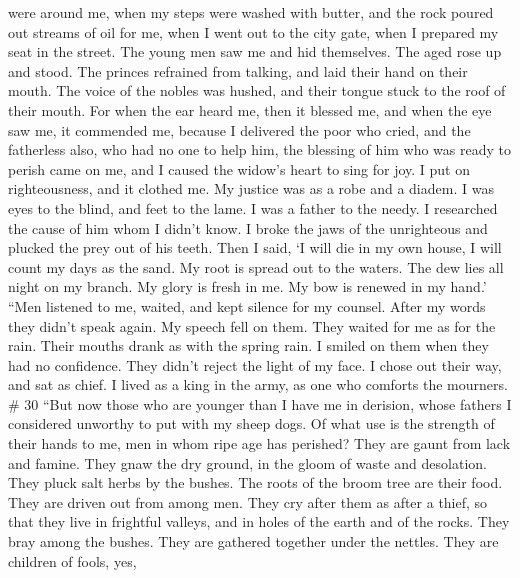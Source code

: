 were around me,  when my steps were washed with butter, and
the rock poured out streams of oil for me,  when I went out
to the city gate, when I prepared my seat in the street. 
The young men saw me and hid themselves. The aged rose up and stood.
 The princes refrained from talking, and laid their hand on
their mouth.  The voice of the nobles was hushed, and their
tongue stuck to the roof of their mouth.  For when the ear
heard me, then it blessed me, and when the eye saw me, it commended me,
 because I delivered the poor who cried, and the fatherless
also, who had no one to help him,  the blessing of him who
was ready to perish came on me, and I caused the widow's heart to sing
for joy.  I put on righteousness, and it clothed me. My
justice was as a robe and a diadem.  I was eyes to the
blind, and feet to the lame.  I was a father to the needy.
I researched the cause of him whom I didn't know.  I broke
the jaws of the unrighteous and plucked the prey out of his teeth.
 Then I said, `I will die in my own house, I will count my
days as the sand.  My root is spread out to the waters. The
dew lies all night on my branch.  My glory is fresh in me.
My bow is renewed in my hand.'  ``Men listened to me,
waited, and kept silence for my counsel.  After my words
they didn't speak again. My speech fell on them.  They
waited for me as for the rain. Their mouths drank as with the spring
rain.  I smiled on them when they had no confidence. They
didn't reject the light of my face.  I chose out their way,
and sat as chief. I lived as a king in the army, as one who comforts the
mourners. \# 30  ``But now those who are younger than I have
me in derision, whose fathers I considered unworthy to put with my sheep
dogs.  Of what use is the strength of their hands to me, men
in whom ripe age has perished?  They are gaunt from lack and
famine. They gnaw the dry ground, in the gloom of waste and desolation.
 They pluck salt herbs by the bushes. The roots of the broom
tree are their food.  They are driven out from among men.
They cry after them as after a thief,  so that they live in
frightful valleys, and in holes of the earth and of the rocks.
 They bray among the bushes. They are gathered together
under the nettles.  They are children of fools, yes,

